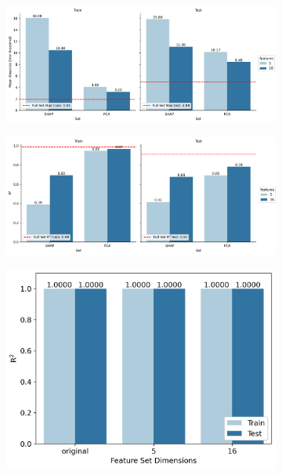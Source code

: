 \documentclass[journal=jacsat,manuscript=article]{achemso}
\begin{document}
\begin{figure}[H]
	\centering
	\begin{subfigure}[b]{0.49\textwidth}
		\centering
		\includegraphics[width=\textwidth]{../images/BSE/classical_features_MAE.png}
		\caption{}
		\label{fig:BSE_bse_classical_features_MAE}
	\end{subfigure}
	\hfill		
	\begin{subfigure}[b]{0.49\textwidth}
		\centering
		\includegraphics[width=\textwidth]{../images/BSE/classical_features_R2.png}
		\caption{}
		\label{fig:BSE_classical_features_R2}
	\end{subfigure}
	\hfill		
	\begin{subfigure}[b]{0.49\textwidth}
		\centering
		\includegraphics[width=\textwidth]{../images/DDCC/DDCC_feature_set.png}
		\caption{}
		\label{fig:DDCC_feature_set}
	\end{subfigure}
	\hfill	
	\caption{}
	\label{fig:chemical_classical_features}
\end{figure}
\end{document}
